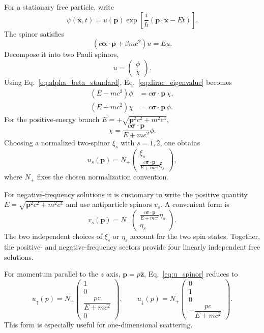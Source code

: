 \documentclass[12pt]{article}
\newcommand{\be}{\begin{equation}}
\newcommand{\ee}{\end{equation}}
\numberwithin{equation}{section}
\begin{document}
For a stationary free particle, write
\be
 \psi(\mathbf{x},t)=u(\mathbf{p})
 \exp\left[\frac{i}{\hbar}(\mathbf{p}\cdot\mathbf{x}-Et)\right].
\label{eq:dirac_plane_wave}
\ee
The spinor satisfies
\be
 \left(c\boldsymbol{\alpha}\cdot\mathbf{p}+\beta mc^2\right)u=Eu.
\label{eq:dirac_eigenvalue}
\ee
Decompose it into two Pauli spinors,
\be
 u=\begin{pmatrix}\phi\\\chi\end{pmatrix}.
\ee
Using Eq.~\eqref{eq:alpha_beta_standard}, Eq.~\eqref{eq:dirac_eigenvalue} becomes
\begin{align}
 (E-mc^2)\phi&=c\boldsymbol{\sigma}\cdot\mathbf{p}\,\chi,
 \label{eq:upper_eq}\\
 (E+mc^2)\chi&=c\boldsymbol{\sigma}\cdot\mathbf{p}\,\phi.
 \label{eq:lower_eq}
\end{align}
For the positive-energy branch $E=+\sqrt{\mathbf{p}^2c^2+m^2c^4}$,
\be
 \chi=\frac{c\boldsymbol{\sigma}\cdot\mathbf{p}}{E+mc^2}\phi.
\ee
Choosing a normalized two-spinor $\xi_s$ with $s=1,2$, one obtains
\be
 u_s(\mathbf{p})
 =N_+
 \begin{pmatrix}
 \xi_s\\[2mm]
 \displaystyle\frac{c\boldsymbol{\sigma}\cdot\mathbf{p}}{E+mc^2}\xi_s
 \end{pmatrix},
\label{eq:u_spinor}
\ee
where $N_+$ fixes the chosen normalization convention.

For negative-frequency solutions it is customary to write the positive quantity $E=\sqrt{\mathbf{p}^2c^2+m^2c^4}$ and use antiparticle spinors $v_s$. A convenient form is
\be
 v_s(\mathbf{p})
 =N_-
 \begin{pmatrix}
 \displaystyle\frac{c\boldsymbol{\sigma}\cdot\mathbf{p}}{E+mc^2}\eta_s\\[2mm]
 \eta_s
 \end{pmatrix}.
\label{eq:v_spinor}
\ee
The two independent choices of $\xi_s$ or $\eta_s$ account for the two spin states. Together, the positive- and negative-frequency sectors provide four linearly independent free solutions.

For momentum parallel to the $z$ axis, $\mathbf{p}=p\hat{\mathbf{z}}$, Eq.~\eqref{eq:u_spinor} reduces to
\be
 u_\uparrow(p)=N_+
 \begin{pmatrix}
 1\\0\\\dfrac{pc}{E+mc^2}\\0
 \end{pmatrix},
 \qquad
 u_\downarrow(p)=N_+
 \begin{pmatrix}
 0\\1\\0\\-\dfrac{pc}{E+mc^2}
 \end{pmatrix}.
\label{eq:z_spinors}
\ee
This form is especially useful for one-dimensional scattering.
\end{document}
